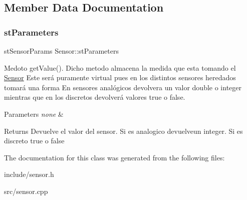 \subsection{Member Data Documentation}
\mbox{\label{classSensor_aecbcb46558e78b3f9bb0db37c76ced6b}} 
\subsubsection{\texorpdfstring{st\+Parameters}{stParameters}}
{\footnotesize\ttfamily st\+Sensor\+Params Sensor\+::st\+Parameters\hspace{0.3cm}{\ttfamily [protected]}}



Medoto get\+Value(). Dicho metodo almacena la medida que esta tomando el \hyperlink{classSensor}{Sensor} Este será puramente virtual pues en los distintos sensores heredados tomará una forma En sensores analógicos devolvera un valor double o integer mientras que en los discretos devolverá valores true o false. 


\begin{DoxyParams}{Parameters}
{\em none} & \\
\hline
\end{DoxyParams}
\begin{DoxyReturn}{Returns}
Devuelve el valor del sensor. Si es analogico devuelveun integer. Si es discreto true o false 
\end{DoxyReturn}


The documentation for this class was generated from the following files\+:\begin{DoxyCompactItemize}
\item 
include/sensor.\+h\item 
src/sensor.\+cpp\end{DoxyCompactItemize}
